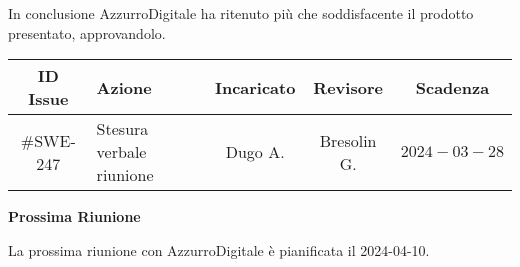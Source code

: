 \documentclass[10pt, a4paper]{article}
\begin{document}
\begin{paracol}{2}
In conclusione AzzurroDigitale ha ritenuto più che soddisfacente il prodotto presentato, approvandolo.
~\vspace{12.0em}

\decisioni
\end{paracol}


\newpage


{\renewcommand{\arraystretch}{1.5}
\begin{tabularx}{\textwidth}{c|X|c|c|c}
\textbf{ID Issue} & \textbf{Azione} & \textbf{Incaricato} & \textbf{Revisore} & \textbf{Scadenza} \\
\hline
\#SWE-247 &
Stesura verbale riunione &
Dugo A. &
Bresolin G. &
$2024-03-28$ \\

\end{tabularx}}

\vspace{3em}


\textbf{Prossima Riunione}

La prossima riunione con AzzurroDigitale è pianificata il 2024-04-10.
\end{document}

